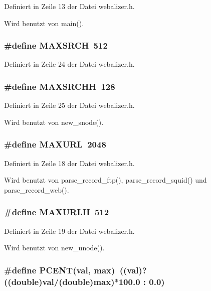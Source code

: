 Definiert in Zeile 13 der Datei webalizer.h.

Wird benutzt von main().
\subsubsection{\setlength{\rightskip}{0pt plus 5cm}\#define MAXSRCH~512}\label{webalizer_8h_fbd0e79f3020d8a6df0a85a2300bbd3c}




Definiert in Zeile 24 der Datei webalizer.h.
\subsubsection{\setlength{\rightskip}{0pt plus 5cm}\#define MAXSRCHH~128}\label{webalizer_8h_da235f98b7907e34754de783b33f69f1}




Definiert in Zeile 25 der Datei webalizer.h.

Wird benutzt von new\_\-snode().
\subsubsection{\setlength{\rightskip}{0pt plus 5cm}\#define MAXURL~2048}\label{webalizer_8h_154e43d94122a068e2f1b110ef9885fa}




Definiert in Zeile 18 der Datei webalizer.h.

Wird benutzt von parse\_\-record\_\-ftp(), parse\_\-record\_\-squid() und parse\_\-record\_\-web().
\subsubsection{\setlength{\rightskip}{0pt plus 5cm}\#define MAXURLH~512}\label{webalizer_8h_25de11d4cd5b64bfd955e494e2b5d815}




Definiert in Zeile 19 der Datei webalizer.h.

Wird benutzt von new\_\-unode().
\subsubsection{\setlength{\rightskip}{0pt plus 5cm}\#define PCENT(val, max)~((val)?((double)val/(double)max)$\ast$100.0 : 0.0)}\label{webalizer_8h_349ccc58930e23a50f4cdd125a2edf7d}




